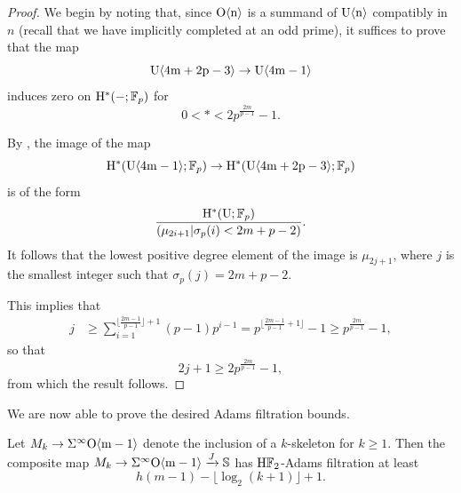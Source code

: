 \begin{proof}
  We begin by noting that, since $\mathrm{O}\mathrm{\langle n \rangle}$ is a summand of $\mathrm{U} \mathrm{\langle n \rangle}$ compatibly in $n$ (recall that we have implicitly completed at an odd prime), it suffices to prove that the map \[\mathrm{U} \mathrm{\langle 4m+2p-3 \rangle} \to \mathrm{U} \mathrm{\langle 4m-1 \rangle}\] induces zero on $\mathrm{H}^* (-; \operatorname{\mathbb{F}}_p)$ for \[0 < * < 2p^{\frac{2m}{p-1}} - 1.\]

	By , the image of the map \[\mathrm{H}^* (\mathrm{U} \mathrm{\langle 4m-1 \rangle}; \operatorname{\mathbb{F}}_p) \to \mathrm{H}^* (\mathrm{U} \mathrm{\langle 4m+2p-3\rangle}; \operatorname{\mathbb{F}}_p)\] is of the form \[\frac{\mathrm{H}^{*} (\mathrm{U}; \operatorname{\mathbb{F}}_p)}{(\mu_{2i+1} \vert \sigma_p (i) < 2m+p-2)}.\] It follows that the lowest positive degree element of the image is $\mu_{2j+1}$, where $j$ is the smallest integer such that $\sigma_p (j) = 2m+p-2$.

	This implies that
	\begin{align*}
		j &\geq \sum_{i=1} ^{\lfloor \frac{2m-1}{p-1} \rfloor + 1} (p-1) p^{i-1} 
		= p^{\lfloor \frac{2m-1}{p-1} + 1 \rfloor} - 1 
		\geq p^{\frac{2m}{p-1}} -1,
	\end{align*}
	so that \[2j+1 \geq 2p^{\frac{2m}{p-1}} - 1,\] from which the result follows.
%
%
\end{proof}

We are now able to prove the desired Adams filtration bounds.

\begin{lem}\label{prop:genHF2filt}
    Let $M_{k} \to \Sigma^{\infty} \mathrm{O}\mathrm{\langle m-1 \rangle}$ denote the inclusion of a $k$-skeleton for $k \geq 1$. Then the composite map $M_{k} \to \Sigma^{\infty} \mathrm{O}\mathrm{\langle m-1 \rangle} \xrightarrow{J} \operatorname{\mathbb{S}}$ has $\mathrm{H}\mathbb{F}_2$-Adams filtration at least \[h(m-1) - \lfloor \log_2 (k+1) \rfloor + 1.\]
\end{lem}

